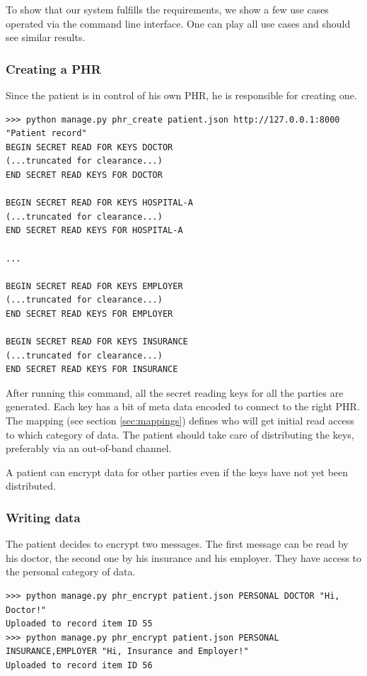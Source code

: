 \documentclass[a4paper]{article}
\begin{document}
		To show that our system fulfills the requirements, we show a few use cases operated via the command line interface. One can play all use cases and should see similar results.
		
		\subsubsection{Creating a PHR}\label{sec:usecase_1}
			Since the patient is in control of his own PHR, he is responsible for creating one.
		
			\begin{lstlisting}
>>> python manage.py phr_create patient.json http://127.0.0.1:8000 "Patient record"
BEGIN SECRET READ FOR KEYS DOCTOR
(...truncated for clearance...)
END SECRET READ KEYS FOR DOCTOR

BEGIN SECRET READ FOR KEYS HOSPITAL-A
(...truncated for clearance...)
END SECRET READ KEYS FOR HOSPITAL-A

...

BEGIN SECRET READ FOR KEYS EMPLOYER
(...truncated for clearance...)
END SECRET READ KEYS FOR EMPLOYER

BEGIN SECRET READ FOR KEYS INSURANCE
(...truncated for clearance...)
END SECRET READ KEYS FOR INSURANCE
			\end{lstlisting}
		
			After running this command, all the secret reading keys for all the parties are generated. Each key has a bit of meta data encoded to connect to the right PHR. The mapping (see section \ref{sec:mappings}) defines who will get initial read access to which category of data. The patient should take care of distributing the keys, preferably via an out-of-band channel.
		
			A patient can encrypt data for other parties even if the keys have not yet been distributed.
		
		\subsubsection{Writing data}\label{sec:usecase_2}
			The patient decides to encrypt two messages. The first message can be read by his doctor, the second one by his insurance and his employer. They have access to the personal category of data.
		
			\begin{lstlisting}
>>> python manage.py phr_encrypt patient.json PERSONAL DOCTOR "Hi, Doctor!"
Uploaded to record item ID 55
>>> python manage.py phr_encrypt patient.json PERSONAL INSURANCE,EMPLOYER "Hi, Insurance and Employer!"
Uploaded to record item ID 56
			\end{lstlisting}
		
\end{document}
